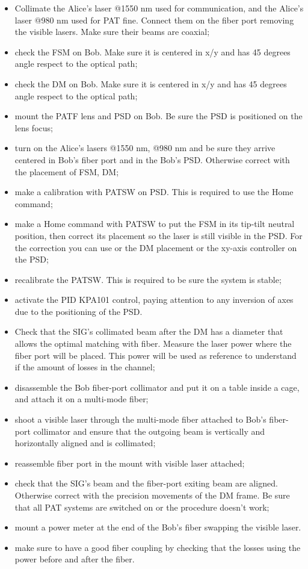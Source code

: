 \begin{itemize}
  \item Collimate the Alice's laser @1550 nm used for communication, and the Alice's laser @980 nm used for PAT fine. Connect them on the fiber port removing the visible lasers. Make sure their beams are coaxial;
  \item check the FSM on Bob. Make sure it is centered in x/y and has 45 degrees angle respect to the optical path;
  \item check the DM on Bob. Make sure it is centered in x/y and has 45 degrees angle respect to the optical path;
  \item mount the PATF lens and PSD on Bob. Be sure the PSD is positioned on the lens focus;
  \item turn on the Alice's lasers @1550 nm, @980 nm and be sure they arrive centered in Bob's fiber port and in the Bob's PSD. Otherwise correct with the placement of FSM, DM;
  \item make a calibration with PATSW on PSD. This is required to use the Home command;
  \item make a Home command with PATSW to put the FSM in its tip-tilt neutral position, then correct its placement so the laser is still visible in the PSD. For the correction you can use or the DM placement or the xy-axis controller on the PSD;
  \item recalibrate the PATSW. This is required to be sure the system is stable;
  \item activate the PID KPA101 control, paying attention to any inversion of axes due to the positioning of the PSD.
\end{itemize}

\begin{itemize}
  \item Check that the SIG's collimated beam after the DM has a diameter that allows the optimal matching with fiber. Measure the laser power where the fiber port will be placed. This power will be used as reference to understand if the amount of losses in the channel;
  \item disassemble the Bob fiber-port collimator and put it on a table inside a cage, and attach it on a multi-mode fiber;
  \item shoot a visible laser through the multi-mode fiber attached to Bob's fiber-port collimator and ensure that the outgoing beam is vertically and horizontally aligned and is collimated;
  \item reassemble fiber port in the mount with visible laser attached;
  \item check that the SIG's beam and the fiber-port exiting beam are aligned. Otherwise correct with the precision movements of the DM frame. Be sure that all PAT systems are switched on or the procedure doesn't work;
  \item mount a power meter at the end of the Bob's fiber swapping the visible laser.
  \item make sure to have a good fiber coupling by checking that the losses using the power before and after the fiber.
\end{itemize}

